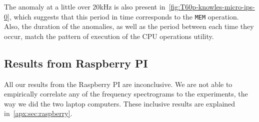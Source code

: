 The anomaly at a little over 20kHz is also present in~\autoref{fig:T60p-knowles-micro-ips-0}, which suggests that this period in time corresponds to the \texttt{MEM} operation.
Also, the duration of the anomalies, as well as the period between each time they occur, match the pattern of execution of the CPU operations utility.


\subsection{Results from Raspberry PI}\label{chp5:subsec:rb_bk_results}
All our results from the Raspberry PI are inconclusive.
We are not able to empirically correlate any of the frequency spectrograms to the experiments, the way we did the two laptop computers.
These inclusive results are explained in~\autoref{apx:sec:raspberry}.

